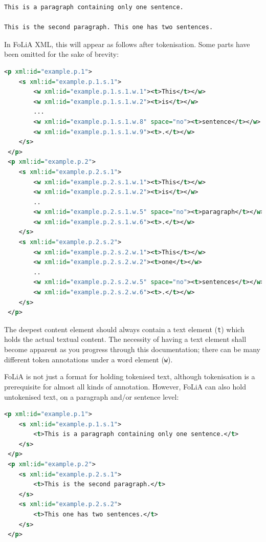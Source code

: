 \documentclass[a4paper,12pt]{report}
\begin{document}
\begin{verbatim}
This is a paragraph containing only one sentence.

This is the second paragraph. This one has two sentences.
\end{verbatim}

In FoLiA XML, this will appear as follows after tokenisation. Some parts have been omitted for the sake of brevity:


\begin{lstlisting}[language=xml]
 <p xml:id="example.p.1">
    <s xml:id="example.p.1.s.1">        
        <w xml:id="example.p.1.s.1.w.1"><t>This</t></w>
        <w xml:id="example.p.1.s.1.w.2"><t>is</t></w>
        ...
        <w xml:id="example.p.1.s.1.w.8" space="no"><t>sentence</t></w>
        <w xml:id="example.p.1.s.1.w.9"><t>.</t></w>
    </s>
 </p>
 <p xml:id="example.p.2">
    <s xml:id="example.p.2.s.1">
        <w xml:id="example.p.2.s.1.w.1"><t>This</t></w>
        <w xml:id="example.p.2.s.1.w.2"><t>is</t></w>    
        ..
        <w xml:id="example.p.2.s.1.w.5" space="no"><t>paragraph</t></w>    
        <w xml:id="example.p.2.s.1.w.6"><t>.</t></w>    
    </s>
    <s xml:id="example.p.2.s.2">
        <w xml:id="example.p.2.s.2.w.1"><t>This</t></w>
        <w xml:id="example.p.2.s.2.w.2"><t>one</t></w>    
        ..
        <w xml:id="example.p.2.s.2.w.5" space="no"><t>sentences</t></w>    
        <w xml:id="example.p.2.s.2.w.6"><t>.</t></w>    
    </s>
 </p>
\end{lstlisting}


The deepest content element should always contain a text element (\texttt{t}) which holds the actual textual content. The necessity of having a text element shall become apparent as you progress through this documentation; there can be many different token annotations under a word element (\texttt{w}).

FoLiA is not just a format for holding tokenised text, although tokenisation is a prerequisite for almost all kinds of annotation. However, FoLiA can also hold untokenised text, on a paragraph and/or sentence level:

\begin{lstlisting}[language=xml]
 <p xml:id="example.p.1">
    <s xml:id="example.p.1.s.1">        
        <t>This is a paragraph containing only one sentence.</t>
    </s>
 </p>
 <p xml:id="example.p.2">
    <s xml:id="example.p.2.s.1">     
        <t>This is the second paragraph.</t>
    </s>
    <s xml:id="example.p.2.s.2">     
        <t>This one has two sentences.</t>
    </s>    
 </p>
\end{lstlisting}
\end{document}
